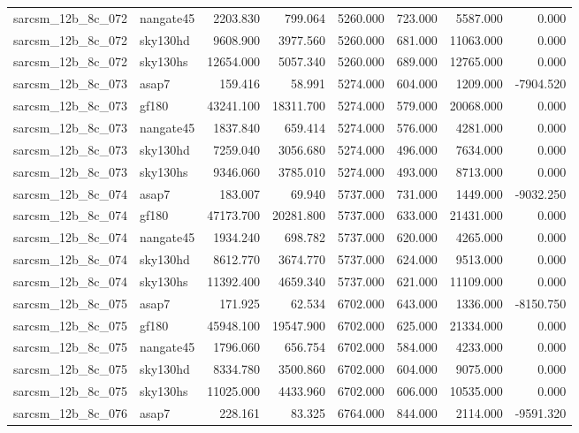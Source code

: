 \begin{tabular}{llrrrrrr}
sarcsm\_12b\_8c\_072 & nangate45 & 2203.830 & 799.064 & 5260.000 & 723.000 & 5587.000 & 0.000 \\
sarcsm\_12b\_8c\_072 & sky130hd & 9608.900 & 3977.560 & 5260.000 & 681.000 & 11063.000 & 0.000 \\
sarcsm\_12b\_8c\_072 & sky130hs & 12654.000 & 5057.340 & 5260.000 & 689.000 & 12765.000 & 0.000 \\
sarcsm\_12b\_8c\_073 & asap7 & 159.416 & 58.991 & 5274.000 & 604.000 & 1209.000 & -7904.520 \\
sarcsm\_12b\_8c\_073 & gf180 & 43241.100 & 18311.700 & 5274.000 & 579.000 & 20068.000 & 0.000 \\
sarcsm\_12b\_8c\_073 & nangate45 & 1837.840 & 659.414 & 5274.000 & 576.000 & 4281.000 & 0.000 \\
sarcsm\_12b\_8c\_073 & sky130hd & 7259.040 & 3056.680 & 5274.000 & 496.000 & 7634.000 & 0.000 \\
sarcsm\_12b\_8c\_073 & sky130hs & 9346.060 & 3785.010 & 5274.000 & 493.000 & 8713.000 & 0.000 \\
sarcsm\_12b\_8c\_074 & asap7 & 183.007 & 69.940 & 5737.000 & 731.000 & 1449.000 & -9032.250 \\
sarcsm\_12b\_8c\_074 & gf180 & 47173.700 & 20281.800 & 5737.000 & 633.000 & 21431.000 & 0.000 \\
sarcsm\_12b\_8c\_074 & nangate45 & 1934.240 & 698.782 & 5737.000 & 620.000 & 4265.000 & 0.000 \\
sarcsm\_12b\_8c\_074 & sky130hd & 8612.770 & 3674.770 & 5737.000 & 624.000 & 9513.000 & 0.000 \\
sarcsm\_12b\_8c\_074 & sky130hs & 11392.400 & 4659.340 & 5737.000 & 621.000 & 11109.000 & 0.000 \\
sarcsm\_12b\_8c\_075 & asap7 & 171.925 & 62.534 & 6702.000 & 643.000 & 1336.000 & -8150.750 \\
sarcsm\_12b\_8c\_075 & gf180 & 45948.100 & 19547.900 & 6702.000 & 625.000 & 21334.000 & 0.000 \\
sarcsm\_12b\_8c\_075 & nangate45 & 1796.060 & 656.754 & 6702.000 & 584.000 & 4233.000 & 0.000 \\
sarcsm\_12b\_8c\_075 & sky130hd & 8334.780 & 3500.860 & 6702.000 & 604.000 & 9075.000 & 0.000 \\
sarcsm\_12b\_8c\_075 & sky130hs & 11025.000 & 4433.960 & 6702.000 & 606.000 & 10535.000 & 0.000 \\
sarcsm\_12b\_8c\_076 & asap7 & 228.161 & 83.325 & 6764.000 & 844.000 & 2114.000 & -9591.320 \\

\end{tabular}
